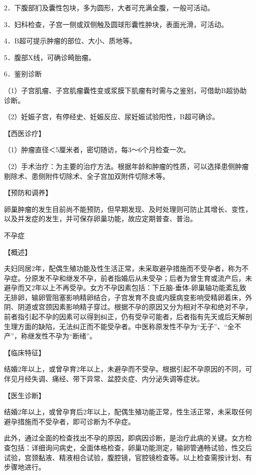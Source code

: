 \documentclass[12pt,UTF8]{ctexbook}
\begin{document}
2．下腹部扪及囊性包块，多为圆形，大者可充满全腹，一般可活动。

3．妇科检查，子宫一侧或双侧触及圆球形囊性肿块，表面光滑，可活动。

4．B超可提示肿瘤的部位、大小、质地等。

5．腹部X线，可确诊畸胎瘤。

6．鉴别诊断

（1）子宫肌瘤、子宫肌瘤囊性变或浆膜下肌瘤有时需与之鉴别，可借助B超协助诊断。

（2）妊娠子宫，有停经史、妊娠反应、尿妊娠试验阳性，B超可确诊。

【西医诊疗】

（1）肿瘤直径＜5厘米者，密切随访，每3～6个月检查一次。

（2）手术治疗：为主要的治疗方法。根据年龄和肿瘤的性质，可以选择患侧肿瘤剔除术、患侧附件切除术、全子宫加双附件切除术等。

【预防和调养】

卵巢肿瘤的发生目前尚不能预防，但早期发现、及时处理则可防止其增长、变性，以及并发症的发生，并可保存卵巢功能，故应定期普查、普治。





不孕症


【概述】

夫妇同居2年，配偶生殖功能及性生活正常，未采取避孕措施而不受孕者，称为不孕症。分原发不孕和继发不孕，前者指婚后从未受孕；后者为曾生育或流产后，未避孕而又2年以上不再受孕。女方不孕因素包括：下丘脑-垂体-卵巢轴功能紊乱致无排卵，输卵管阻塞影响精卵结合，子宫发育不良或内膜病变影响受精卵着床，外阴、阴道或宫颈因素影响精子穿过。根据不孕的原因又分为相对不孕和绝对不孕，前者指引起不孕的因素可以得到纠正，仍有受孕可能者，后者指有先天或后天解剖生理方面的缺陷，无法纠正而不能受孕者。中医称原发性不孕为“无子”、“全不产”，称继发性不孕为“断绪”。

【临床特征】

结婚2年以上，或曾孕育2年以上，未避孕而不受孕。根据引起不孕原因的不同，可伴见月经失调、痛经、带下异常、盆腔炎症、内分泌失调等症状。

【医生诊断】

结婚2年以上，或曾孕育后2年以上，配偶生殖功能正常，性生活正常，未采取任何避孕措施而不受孕者，即可诊断为不孕症。

此外，通过全面的检查找出不孕的原因，即病因诊断，是治疗此病的关键。女方检查包括：详细询问病史，全面体格检查，卵巢功能测定，输卵管通畅试验，性交后试验，宫颈黏液、精液相合试验，腹腔镜，官腔镜检查等。以上检查需按计划、有步骤地进行。
\end{document}

